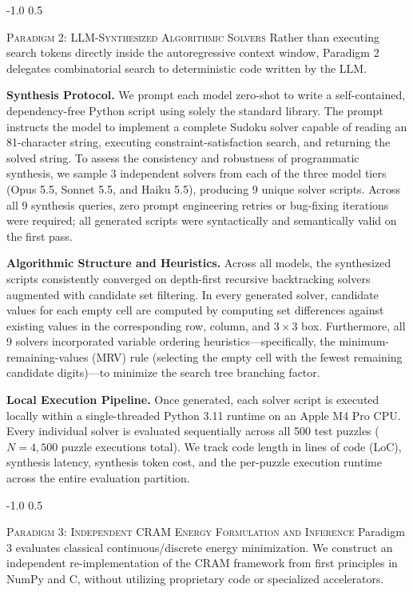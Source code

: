 \documentclass{article} %
\makeatletter
\renewcommand{\subsection}{\@startsection{subsection}{2}{\z@}%
  {-1.0\baselineskip}%
  {0.5\baselineskip}%
  {\normalfont\fontsize{10pt}{12pt}\selectfont\scshape\raggedright}}
\makeatother
\begin{document}
\subsection{\textsc{Paradigm 2: LLM-Synthesized Algorithmic Solvers}}
Rather than executing search tokens directly inside the autoregressive context window, Paradigm 2 delegates combinatorial search to deterministic code written by the LLM.

\textbf{Synthesis Protocol.} We prompt each model zero-shot to write a self-contained, dependency-free Python script using solely the standard library. The prompt instructs the model to implement a complete Sudoku solver capable of reading an 81-character string, executing constraint-satisfaction search, and returning the solved string. To assess the consistency and robustness of programmatic synthesis, we sample 3 independent solvers from each of the three model tiers (Opus 5.5, Sonnet 5.5, and Haiku 5.5), producing 9 unique solver scripts. Across all 9 synthesis queries, zero prompt engineering retries or bug-fixing iterations were required; all generated scripts were syntactically and semantically valid on the first pass.

\textbf{Algorithmic Structure and Heuristics.} Across all models, the synthesized scripts consistently converged on depth-first recursive backtracking solvers augmented with candidate set filtering. In every generated solver, candidate values for each empty cell are computed by computing set differences against existing values in the corresponding row, column, and $3 \times 3$ box. Furthermore, all 9 solvers incorporated variable ordering heuristics—specifically, the minimum-remaining-values (MRV) rule (selecting the empty cell with the fewest remaining candidate digits)—to minimize the search tree branching factor.

\textbf{Local Execution Pipeline.} Once generated, each solver script is executed locally within a single-threaded Python 3.11 runtime on an Apple M4 Pro CPU. Every individual solver is evaluated sequentially across all 500 test puzzles ($N=4,500$ puzzle executions total). We track code length in lines of code (LoC), synthesis latency, synthesis token cost, and the per-puzzle execution runtime across the entire evaluation partition.

\subsection{\textsc{Paradigm 3: Independent CRAM Energy Formulation and Inference}}
Paradigm 3 evaluates classical continuous/discrete energy minimization. We construct an independent re-implementation of the CRAM framework from first principles in NumPy and C, without utilizing proprietary code or specialized accelerators.
\end{document}
